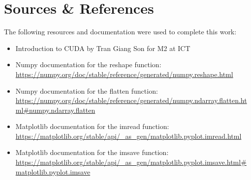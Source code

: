 \documentclass[11pt, a4paper]{article}
\begin{document}
\section{Sources \& References}
The following resources and documentation were used to complete this work:

\begin{itemize}
    \item Introduction to CUDA by Tran Giang Son for M2 at ICT\\
    \item Numpy documentation for the reshape function: \\
    \url{https://numpy.org/doc/stable/reference/generated/numpy.reshape.html}

    \item Numpy documentation for the flatten function: \\
    \url{https://numpy.org/doc/stable/reference/generated/numpy.ndarray.flatten.html#numpy.ndarray.flatten}

    \item Matplotlib documentation for the imread function: \\
    \url{https://matplotlib.org/stable/api/_as_gen/matplotlib.pyplot.imread.html}

    \item Matplotlib documentation for the imsave function: \\
    \url{https://matplotlib.org/stable/api/_as_gen/matplotlib.pyplot.imsave.html#matplotlib.pyplot.imsave}
\end{itemize}
\end{document}
